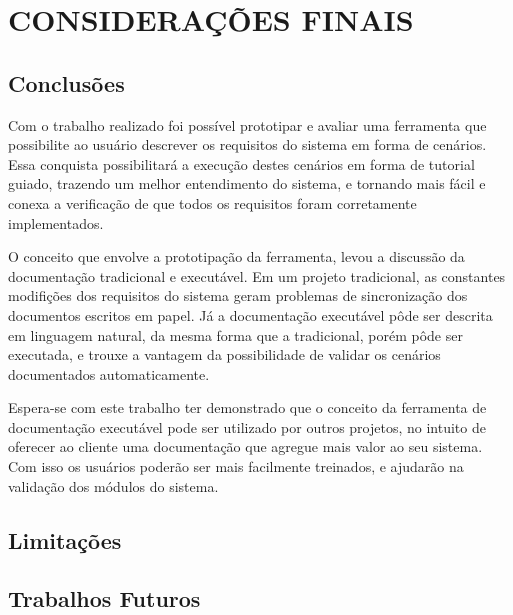 \chapter{CONSIDERAÇÕES FINAIS}

\section{Conclusões}

Com o trabalho realizado foi possível prototipar e avaliar uma ferramenta que possibilite ao usuário descrever os requisitos do sistema em forma de cenários. Essa conquista possibilitará a execução destes cenários em forma de tutorial guiado, trazendo um melhor entendimento do sistema, e tornando mais fácil e conexa a verificação de que todos os requisitos foram corretamente implementados.

O conceito que envolve a prototipação da ferramenta, levou a discussão da documentação tradicional e executável. Em um projeto tradicional, as constantes modifições dos requisitos do sistema geram problemas de sincronização dos documentos escritos em papel. Já a documentação executável pôde ser descrita em linguagem natural, da mesma forma que a tradicional, porém pôde ser executada, e trouxe a vantagem da possibilidade de validar os cenários documentados automaticamente.

Espera-se com este trabalho ter demonstrado que o conceito da ferramenta de documentação executável pode ser utilizado por outros projetos, no intuito de oferecer ao cliente uma documentação que agregue mais valor ao seu sistema. Com isso os usuários poderão ser mais facilmente treinados, e ajudarão na validação dos módulos do sistema.

\section{Limitações}

\section{Trabalhos Futuros}